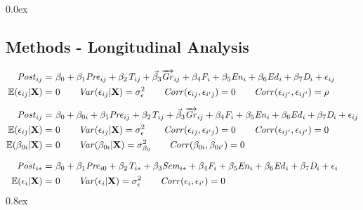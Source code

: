 \documentclass[a0,landscape]{a0poster}
\begin{document}
\begin{multicols}{3}
\parskip 0.0ex
\subsection*{Methods - Longitudinal Analysis}

\begin{align}
\mathit{Post}_{ij} = & ~ \beta_0 
                     + \beta_1 \mathit{Pre}_{ij}
                     + \beta_2 \mathit{T}_{ij}
                     + \vec\beta_{3} \overrightarrow{\mathit{Gr}}_{ij}
                     + \beta_4 \mathit{F}_{i}
                     + \beta_5 \mathit{En}_{i}
                     + \beta_6 \mathit{Ed}_{i}
                     + \beta_7 \mathit{D}_{i}
                     + \epsilon_{ij}
                     \label{eq:model1} \\
\mathbb{E}(\epsilon_{ij} | \mathbf{X} ) = & ~ 0 \nonumber \qquad
\mathit{Var}(\epsilon_{ij} | \mathbf{X} ) = \sigma^2_{\epsilon} \qquad
                    \mathit{Corr}(\epsilon_{ij}, \epsilon_{i'j}) = 0 \qquad
                    \mathit{Corr}(\epsilon_{ij'}, \epsilon_{ij'}) = \rho \nonumber \\[1.5ex]
\mathit{Post}_{ij} = & ~ \beta_0 + \beta_{0i}
                     + \beta_1 \mathit{Pre}_{ij}
                     + \beta_2 \mathit{T}_{ij}
                     + \vec\beta_{3} \overrightarrow{\mathit{Gr}}_{ij}
                     + \beta_4 \mathit{F}_{i}
                     + \beta_5 \mathit{En}_{i}
                     + \beta_6 \mathit{Ed}_{i}
                     + \beta_7 \mathit{D}_{i}
                     + \epsilon_{ij}
                     \label{eq:model2} \\
\mathbb{E}(\epsilon_{ij} | \mathbf{X} ) = & ~ 0 \nonumber \qquad
\mathit{Var}(\epsilon_{ij} | \mathbf{X} ) = \sigma^2_{\epsilon} \qquad
                    \mathit{Corr}(\epsilon_{ij}, \epsilon_{i'j}) = 0 \qquad
                    \mathit{Corr}(\epsilon_{ij'}, \epsilon_{ij'}) = 0 \nonumber \\
\mathbb{E}(\beta_{0i} | \mathbf{X} ) = & ~ 0 \nonumber \qquad
\mathit{Var}(\beta_{0i} | \mathbf{X} ) = \sigma^2_{\beta_0} \qquad
                    \mathit{Corr}(\beta_{0i}, \beta_{0i'}) = 0 \nonumber \\[1.5ex]
\mathit{Post}_{i*} = & ~ \beta_0
                     + \beta_1 \mathit{Pre}_{i0}
                     + \beta_2 \mathit{T}_{i*}
                     + \beta_3 \mathit{Sem}_{i*}
                     + \beta_4 \mathit{F}_{i}
                     + \beta_5 \mathit{En}_{i}
                     + \beta_6 \mathit{Ed}_{i}
                     + \beta_7 \mathit{D}_{i}
                     + \epsilon_{i}
                     \label{eq:model3} \\
\mathbb{E}(\epsilon_{i} | \mathbf{X} ) = & ~ 0 \nonumber \qquad
\mathit{Var}(\epsilon_{i} | \mathbf{X} ) = \sigma^2_{\epsilon} \qquad
                    \mathit{Corr}(\epsilon_{i}, \epsilon_{i'}) = 0  \nonumber
\end{align} 
\parskip 0.8ex


\end{multicols}
\end{document}
